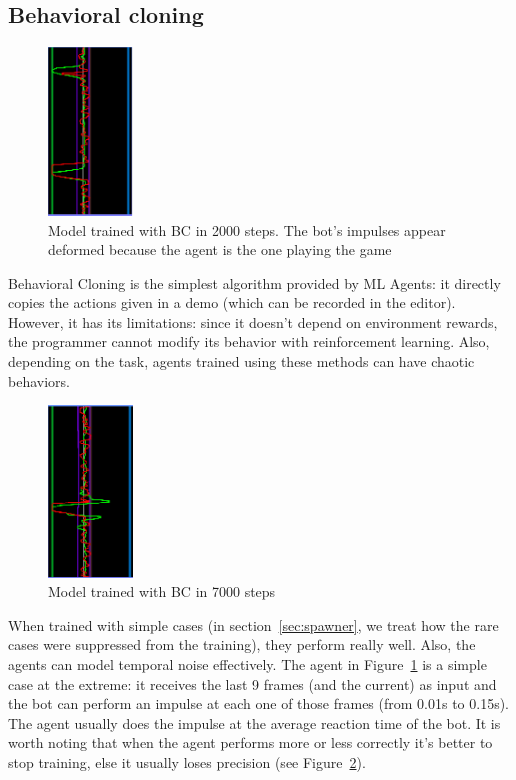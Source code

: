 \subsection{Behavioral cloning}

\begin{figure}
    \centering
    \includegraphics[width=0.2\textwidth]{img/bcTNoise.png}
		\caption{Model trained with BC in 2000 steps. The bot's impulses appear deformed because the agent is the one playing the game}
		\label{fig:bcTNoise}
\end{figure}


Behavioral Cloning is the simplest algorithm provided by ML Agents: it directly copies the actions given in a demo (which can be recorded in the editor). However, it has its limitations: since it doesn't depend on environment rewards, the programmer cannot modify its behavior with reinforcement learning. Also, depending on the task, agents trained using these methods can have chaotic behaviors.

\begin{figure}
    \centering
    \includegraphics[width=0.2\textwidth]{img/bcTNovertrain.png}
		\caption{Model trained with BC in 7000 steps}
		\label{fig:bcTNovertrain}
\end{figure}

When trained with simple cases (in section~\ref{sec:spawner}, we treat how the rare cases were suppressed from the training), they perform really well. Also, the agents can model temporal noise effectively. The agent in Figure~\ref{fig:bcTNoise} is a simple case at the extreme: it receives the last 9 frames (and the current) as input and the bot can perform an impulse at each one of those frames (from 0.01s to 0.15s). The agent usually does the impulse at the average reaction time of the bot. It is worth noting that when the agent performs more or less correctly it's better to stop training, else it usually loses precision (see Figure~\ref{fig:bcTNovertrain}).

